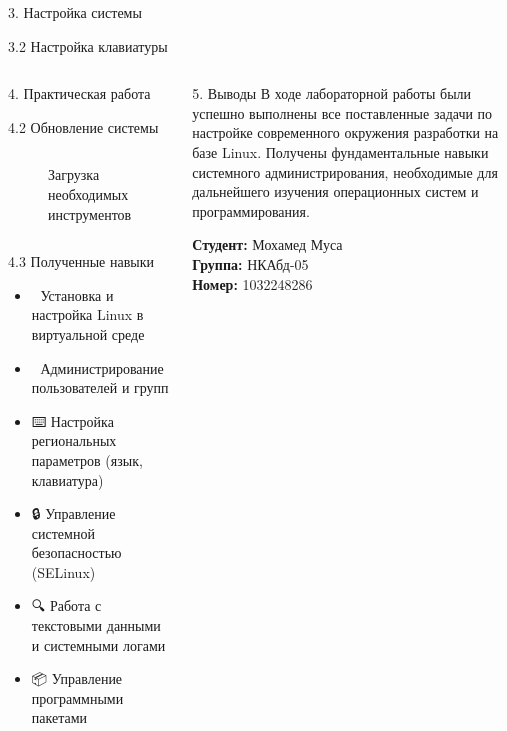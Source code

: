 \documentclass[
  ignorenonframetext,
  aspectratio=169,
  russian,
]{beamer}
\providecommand{\tightlist}{%
  \setlength{\itemsep}{0pt}\setlength{\parskip}{0pt}}
\begin{document}
\begin{frame}[fragile]{3. Настройка системы}
\begin{block}{3.2 Настройка клавиатуры}
\begin{columns}[c]
\begin{frame}[fragile]{4. Практическая работа}
\begin{block}{4.2 Обновление системы}
\begin{columns}[c]
\begin{column}{0.3\linewidth}
\begin{figure}
{}

\caption{\label{fig-update}Загрузка необходимых инструментов}

\end{figure}%
\end{column}
\end{columns}
\end{block}

\begin{block}{4.3 Полученные навыки}
\label{ux43fux43eux43bux443ux447ux435ux43dux43dux44bux435-ux43dux430ux432ux44bux43aux438}
\begin{itemize}[<+->]
\tightlist
\item
  🔧 Установка и настройка Linux в виртуальной среде
\item
  👤 Администрирование пользователей и групп
\item
  ⌨️ Настройка региональных параметров (язык, клавиатура)
\item
  🔒 Управление системной безопасностью (SELinux)
\item
  🔍 Работа с текстовыми данными и системными логами
\item
  📦 Управление программными пакетами
\end{itemize}
\end{block}
\end{frame}

\begin{frame}{5. Выводы}
\label{ux432ux44bux432ux43eux434ux44b}
В ходе лабораторной работы были успешно выполнены все поставленные
задачи по настройке современного окружения разработки на базе Linux.
Получены фундаментальные навыки системного администрирования,
необходимые для дальнейшего изучения операционных систем и
программирования.

\textbf{Студент:} Мохамед Муса\\
\textbf{Группа:} НКАбд-05\\
\textbf{Номер:} 1032248286
\end{frame}
\end{columns}
\end{block}
\end{frame}
\end{document}
